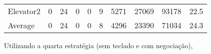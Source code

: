 \documentclass[a4paper]{article}
\begin{document}
\begin{table}[h]
\begin{tabular}{@{}llllllllll@{}}
Elevator2 & 0        & 24            & 0           & 0                                                               & 9                                                                  & 5271                                                         & 27069                                                 & 93178                                                   & 22.5         \\
Average   & 0     & 24         & 0        & 0                                                               & 8                                                               & 4296                                                         & 23390                                                 &  71034                                                  & 24.3         \\ \bottomrule
\end{tabular}
\end{table}

Utilizando a quarta estratégia (sem teclado e com negociação),
\end{document}
